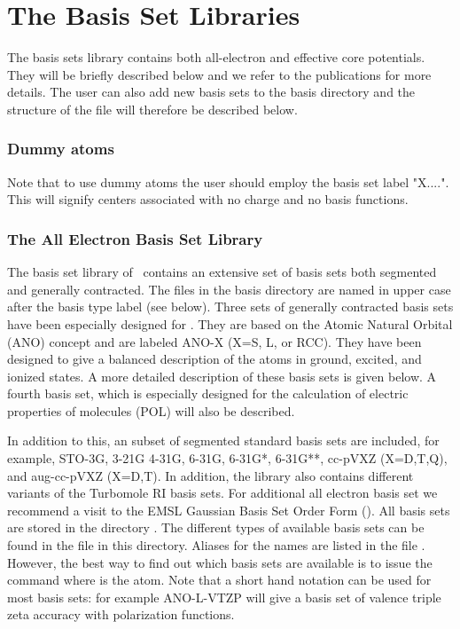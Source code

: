 \section{The Basis Set Libraries}
\label{UG:sec:the_basis_set_libraries}
The basis sets library contains both all-electron and effective core
potentials.  They will be briefly described below and we
refer to the publications for more details. The user can also add new
basis sets to the basis directory and the structure of the file will therefore
be described below.

\subsubsection{Dummy atoms}
Note that to use dummy atoms the user should employ the basis set label "X....". This
will signify centers associated with no charge and no basis functions.

\subsubsection{The All Electron Basis Set Library}

The basis set library of \molcas\ contains an extensive set of basis sets both
segmented and generally contracted. The files in the basis directory are named
in upper case after the basis type
label (see below). Three sets of generally contracted basis sets have been
especially designed for \molcas. They are based on the Atomic Natural Orbital
(ANO) concept and are labeled ANO-X (X=S, L, or RCC). They
have been designed to give a balanced description of the atoms in ground,
excited, and ionized states. A more detailed description of these basis sets is
given below. A fourth basis set, which is especially designed for the
calculation of electric properties of molecules (POL) will also be described.

In addition to this, an
subset of segmented standard basis sets are included, for example, STO-3G,
3-21G 4-31G, 6-31G, 6-31G*, 6-31G**, cc-pVXZ (X=D,T,Q), and aug-cc-pVXZ
(X=D,T). In addition, the library also contains different variants of the
Turbomole RI basis sets. For additional all electron basis set we recommend a
visit to the EMSL Gaussian Basis Set Order Form
(). All basis sets are stored in the
directory . The different types of available basis sets can be
found in the file  in this directory. Aliases for the names are
listed in the file . However, the best way to find out which basis sets
are available is to issue the command  where  is the atom.
Note that a short hand notation can be used for most basis sets: for example
ANO-L-VTZP will give a basis set of valence triple zeta accuracy with
polarization functions.





